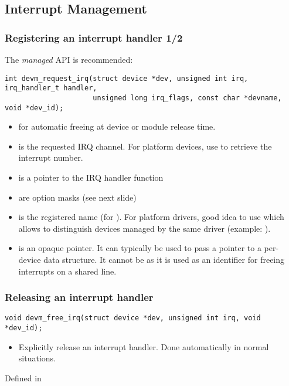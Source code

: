 \subsection{Interrupt Management}

\begin{frame}[fragile]
  \frametitle{Registering an interrupt handler 1/2}
  The {\em managed} API is recommended:
  \begin{verbatim}
int devm_request_irq(struct device *dev, unsigned int irq, irq_handler_t handler,
                     unsigned long irq_flags, const char *devname, void *dev_id);
  \end{verbatim}
  \begin{itemize}
  \item {} for automatic freeing at device or module
        release time.
  \item {} is the requested IRQ channel. For platform
        devices, use  to retrieve the
        interrupt number.
  \item {} is a pointer to the IRQ handler function
  \item {} are option masks (see next slide)
  \item {} is the registered name (for
        ). For platform drivers, good idea
        to use  which allows to distinguish
        devices managed by the same driver (example: ).
  \item {} is an opaque pointer. It can typically
        be used to pass a pointer to a per-device data structure.
        It cannot be  as it is used as an identifier for
        freeing interrupts on a shared line.
  \end{itemize}
\end{frame}

\begin{frame}[fragile]
  \frametitle{Releasing an interrupt handler}
  \begin{verbatim}
void devm_free_irq(struct device *dev, unsigned int irq, void *dev_id);
  \end{verbatim}
  \begin{itemize}
  \item Explicitly release an interrupt handler. Done automatically
        in normal situations.
  \end{itemize}
  Defined in 
\end{frame}

